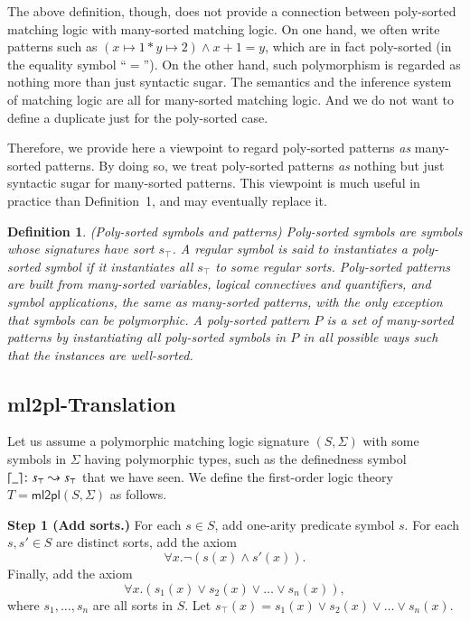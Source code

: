 \documentclass{article}
\theoremstyle{plain}
\newtheorem{defn}[thm]{Definition}
\DeclarePairedDelimiter\ceil{\lceil}{\rceil}
\begin{document}
The above definition, though, does not provide a connection between poly-sorted matching logic with many-sorted matching logic. On one hand, we often write patterns such as $(x \mapsto 1 * y \mapsto 2) \wedge x + 1 = y$, which are in fact poly-sorted (in the equality symbol ``$=$''). On the other hand, such polymorphism is regarded as nothing more than just syntactic sugar. The semantics and the inference system of matching logic are all for many-sorted matching logic. And we do not want to define a duplicate just for the poly-sorted case.

Therefore, we provide here a viewpoint to regard poly-sorted patterns \emph{as} many-sorted patterns. By doing so, we treat poly-sorted patterns \emph{as} nothing but just syntactic sugar for many-sorted patterns. This viewpoint is much useful in practice than Definition~1, and may eventually replace it.

\begin{defn} (Poly-sorted symbols and patterns)
Poly-sorted symbols are symbols whose signatures have sort $s_\top$. A regular symbol is said to \emph{instantiates} a poly-sorted symbol if it instantiates all $s_\top$ to some regular sorts.
	Poly-sorted patterns are built from many-sorted variables, logical connectives and quantifiers, and symbol applications, the same as many-sorted patterns, with the only exception that symbols can be polymorphic. A poly-sorted pattern $P$ is a set of many-sorted patterns by instantiating all poly-sorted symbols in $P$ in all possible ways such that the instances are well-sorted.
\end{defn}

\subsection{\textsf{ml2pl}-Translation}

Let us assume a polymorphic matching logic signature $(S,\Sigma)$ with some symbols in $\Sigma$ having polymorphic types, such as the definedness symbol $\ceil*{\_} \colon s_\top \leadsto s_\top$ that we have seen. We define the first-order logic theory $T = \mathsf{ml2pl}(S,\Sigma)$ as follows.

\textbf{Step 1 (Add sorts.)} For each $s \in S$, add one-arity predicate symbol $s$. For each $s, s' \in S$ are distinct sorts, add the axiom
\begin{equation}
\forall x . \neg (s(x) \wedge s'(x)). \tag{Distinct sorts}
\end{equation}
Finally, add the axiom
\begin{equation}
\forall x . \left(s_1(x) \vee s_2(x) \vee \dots \vee s_n(x)\right), \tag{Complete sorts}
\end{equation}
where $s_1,\dots,s_n$ are all sorts in $S$. Let $s_\top(x) = s_1(x) \vee s_2(x) \vee \dots \vee s_n(x)$.
\end{document}
